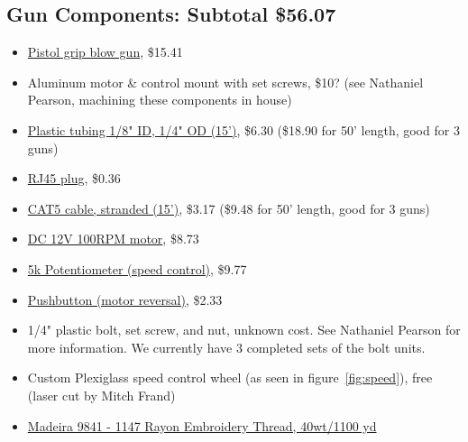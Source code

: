 \documentclass[letterpaper,12pt]{article}
\begin{document}
\subsection{Gun Components: Subtotal \$56.07}
\begin{itemize}
\item{\href{https://www.amazon.com/Milton-S-160-Pistol-Grip-Blow/dp/B00HFL7OYC/ref=sr_1_38?ie=UTF8&qid=1502990735&sr=8-38&keywords=air+blowgun}{Pistol grip blow gun}, \$15.41
}
\item{Aluminum motor \& control mount with set screws, \$10? (see Nathaniel Pearson, machining these components in house)
}
\item{\href{https://www.grainger.com/product/8AT33?cm_mmc=PPC:+Google+PLA&s_kwcid=AL!2966!3!57772102677!!!g!109228327077!&ef_id=WiAW8AAABCj3Xkj0:20180131221551:s&kwid=productads-adid^57772102677-device^c-plaid^109228327077-sku^8AT33-adType^PLA}{Plastic tubing 1/8" ID, 1/4" OD (15')}, \$6.30 (\$18.90 for 50' length, good for 3 guns)
}
\item{\href{https://www.digikey.com/product-detail/en/assmann-wsw-components/A-MO-8-8-F50/AE10316-ND/1957592}{RJ45 plug}, \$0.36
}
\item{\href{https://www.amazon.com/Mediabridge-Ethernet-Cable-Feet-Networking/dp/B001W26TIW/ref=pd_sbs_147_2?_encoding=UTF8&pd_rd_i=B001W26TIW&pd_rd_r=CBZP87PN82231S59BQCK&pd_rd_w=6axY9&pd_rd_wg=DrKOm&psc=1&refRID=CBZP87PN82231S59BQCK}{CAT5 cable, stranded (15')}, \$3.17 (\$9.48 for 50' length, good for 3 guns)
}
\item{\href{https://www.amazon.com/uxcell-100RPM-Reduction-Terminals-Engine/dp/B0711MPZ64/ref=sr_1_8?s=hi&ie=UTF8&qid=1516662559&sr=1-8&keywords=100rpm\%2Bdc\%2Bmotor&th=1}{DC 12V 100RPM motor}, \$8.73
}
\item{\href{https://www.digikey.com/product-detail/en/precision-electronics-corporation/RV4NAYSD502A/RV4N502C-ND/222807&?gclid=EAIaIQobChMI99OA4qOD2QIVFbjACh3Cfg-0EAQYAiABEgKr0PD_BwE}{5k Potentiometer (speed control)}, \$9.77
}
\item{\href{https://www.digikey.com/product-detail/en/te-connectivity-alcoswitch/MSPS103C0/450-1664-ND/529502&?gclid=EAIaIQobChMI6vDSpsaC2QIVRLnACh3oGw7aEAQYASABEgK0UvD_BwE}{Pushbutton (motor reversal)}, \$2.33
}
\item{1/4" plastic bolt, set screw, and nut, unknown cost. See Nathaniel Pearson for more information. We currently have 3 completed sets of the bolt units.
}
\item{Custom Plexiglass speed control wheel (as seen in figure~\ref{fig:speed}), free (laser cut by Mitch Frand)
}
\item{\href{https://www.amazon.com/Madeira-9841-1147-Rayon-Embroidery-Thread/dp/B004KYZF9I}{Madeira 9841 - 1147 Rayon Embroidery Thread, 40wt/1100 yd}
}
\end{itemize}
\end{document}
